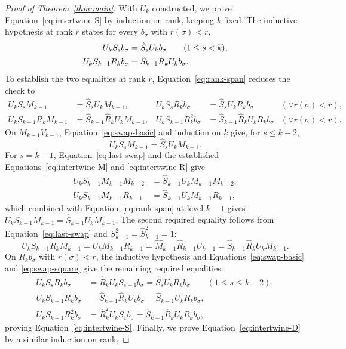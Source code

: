 \documentclass[12pt]{article}
\theoremstyle{plain}
\theoremstyle{definition}
\theoremstyle{remark}
\begin{document}
\begin{proof}[Proof of Theorem~\ref{thm:main}]
With $U_k$ constructed, we prove Equation~\eqref{eq:intertwine-S} by
induction on rank, keeping $k$ fixed. The inductive hypothesis at rank
$r$ states for every $b_\sigma$ with $r(\sigma)<r$,
\begin{align}
U_kS_sb_\sigma&=\hat S_sU_kb_\sigma\qquad(1\le s<k),\notag\\
U_kS_{k-1}R_kb_\sigma&=\hat S_{k-1}\hat R_kU_kb_\sigma.
\label{eq:intertwine-SR}
\end{align}
To establish the two equalities at rank $r$, Equation~\eqref{eq:rank-span}
reduces the check to 
\begin{align*}
    U_kS_sM_{k-1}&=\hat{S}_sU_kM_{k-1}, &U_kS_sR_kb_{\sigma} &= \hat{S}_sU_kR_kb_{\sigma} &(\forall r(\sigma)<r),\\
    U_kS_{k-1}R_kM_{k-1}&=\hat{S}_{k-1}\hat{R}_kU_kM_{k-1},
    &U_kS_{k-1}R_k^2b_{\sigma}&=\hat{S}_{k-1}\hat{R}_kU_kR_kb_{\sigma}&(\forall r(\sigma)<r).
\end{align*}
On $M_{k-1}V_{k-1}$, Equation~\eqref{eq:swap-basic} and induction on $k$
give, for $s\le k-2$,
\[
U_kS_sM_{k-1}=\hat S_sU_kM_{k-1}.
\]
For $s=k-1$, Equation~\eqref{eq:last-swap} and the established
Equations~\eqref{eq:intertwine-M} and \eqref{eq:intertwine-R} give
\begin{align*}
U_kS_{k-1}M_{k-1}M_{k-2}
 &=\hat S_{k-1}U_kM_{k-1}M_{k-2},\\
U_kS_{k-1}M_{k-1}R_{k-1}
 &=\hat S_{k-1}U_kM_{k-1}R_{k-1},
\end{align*}
which combined with Equation~\eqref{eq:rank-span} at level $k-1$ gives
$U_kS_{k-1}M_{k-1}=\hat S_{k-1}U_kM_{k-1}$.
The second required equality follows from
Equation~\eqref{eq:last-swap} and $S_{k-1}^2=\hat S_{k-1}^2=1$:
\[
U_kS_{k-1}R_kM_{k-1}
 =U_kM_{k-1}R_{k-1}
 =\hat M_{k-1}\hat R_{k-1}U_{k-1}
 =\hat S_{k-1}\hat R_kU_kM_{k-1}.
\]
On $R_kb_\sigma$ with $r(\sigma)<r$, the inductive hypothesis and
Equations~\eqref{eq:swap-basic} and \eqref{eq:swap-square} give the
remaining required equalities:
\begin{align*}
U_kS_sR_kb_\sigma
 &=\hat R_kU_kS_{s+1}b_\sigma
 =\hat S_sU_kR_kb_\sigma\qquad(1\le s\le k-2),\\
U_kS_{k-1}R_kb_\sigma
 &=\hat S_{k-1}\hat R_kU_kb_\sigma
 =\hat S_{k-1}U_kR_kb_\sigma,\\
U_kS_{k-1}R_k^2b_\sigma
 &=\hat R_k^2U_kS_1b_\sigma
 =\hat S_{k-1}\hat R_kU_kR_kb_\sigma,
\end{align*}
proving Equation~\eqref{eq:intertwine-S}. Finally, we prove Equation~\eqref{eq:intertwine-D} by a similar induction on rank,

\end{proof}
\end{document}
